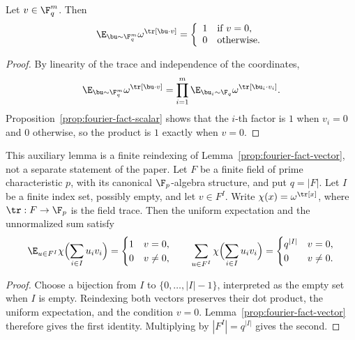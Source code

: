 \begin{lemma}\label{prop:fourier-fact-vector}
	\leanok
	Let $v \in \F_q^m$. Then
	\begin{equation*}
		\E_{\bu \sim \F_q^m} \omega^{\tr[\bu \cdot v]}
		= \left\{\begin{array}{rl}
			1 & \text{if $v = 0$}, \\
			0 & \text{otherwise}.
		\end{array}\right.
	\end{equation*}
\end{lemma}
\begin{proof}
	\leanok
	By linearity of the trace and independence of the coordinates,
	\[
		\E_{\bu \sim \F_q^m} \omega^{\tr[\bu \cdot v]}
		= \prod_{i=1}^m \E_{\bu_i \sim \F_q} \omega^{\tr[\bu_i \cdot v_i]}.
	\]
	Proposition~\ref{prop:fourier-fact-scalar} shows that the $i$-th factor is $1$ when $v_i=0$ and $0$ otherwise, so the product is $1$ exactly when $v=0$.
\end{proof}

\begin{lemma}
\label{lem:fourier-fact-finite-index}
	\leanok
	This auxiliary lemma is a finite reindexing of
	Lemma~\ref{prop:fourier-fact-vector}, not a separate statement of the paper.
	Let $F$ be a finite field of prime characteristic $p$, with its canonical
	$\F_p$-algebra structure, and put $q=|F|$. Let $I$ be a finite index set,
	possibly empty, and let $v\in F^I$. Write
	$\chi(x)=\omega^{\tr[x]}$, where $\tr:F\to\F_p$ is the field trace.
	Then the uniform expectation and the unnormalized sum satisfy
	\[
		\E_{u\in F^I}\chi\Bigl(\sum_{i\in I}u_i v_i\Bigr)
		=\begin{cases}1&v=0,\\0&v\ne0,\end{cases}
		\qquad
		\sum_{u\in F^I}\chi\Bigl(\sum_{i\in I}u_i v_i\Bigr)
		=\begin{cases}q^{|I|}&v=0,\\0&v\ne0.\end{cases}
	\]
\end{lemma}
\begin{proof}
	\leanok
	Choose a bijection from $I$ to $\{0,\ldots,|I|-1\}$, interpreted as
	the empty set when $I$ is empty. Reindexing both vectors preserves their
	dot product, the uniform expectation, and the condition $v=0$.
	Lemma~\ref{prop:fourier-fact-vector} therefore gives the first identity.
	Multiplying by $|F^I|=q^{|I|}$ gives the second.
\end{proof}

